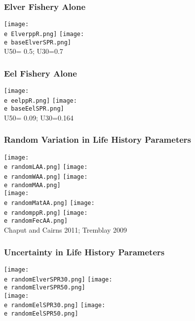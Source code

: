 \documentclass{beamer}
\newcommand{\e}{/backup/bio_data/bio.eels/figures/}
\begin{document}



\begin{frame}
	\frametitle{Elver Fishery Alone}
	\centering
	  \texttt{[image: \\e ElverppR.png]}
	  \texttt{[image: \\e baseElverSPR.png]}\\[-1ex]
	{\tiny{ U50= 0.5; U30=0.7}}


\end{frame}




\begin{frame}
	\frametitle{Eel Fishery Alone}
	\centering
	  \texttt{[image: \\e eelppR.png]}
	  \texttt{[image: \\e baseEelSPR.png]}\\[-1ex]
	{\tiny{ U50= 0.09; U30=0.164}}


\end{frame}



\begin{frame}
	\frametitle{Random Variation in Life History Parameters}
	\centering
	  \texttt{[image: \\e randomLAA.png]}
      \texttt{[image: \\e randomWAA.png]}
 \texttt{[image: \\e randomMAA.png]} \\

 \texttt{[image: \\e randomMatAA.png]}
 \texttt{[image: \\e randomppR.png]}
	\texttt{[image: \\e randomFecAA.png]}\\[-1ex]
	{\tiny Chaput and Cairns 2011; Tremblay 2009}
\end{frame}




\begin{frame}
	\frametitle{Uncertainty in Life History Parameters}
	\centering
	  \texttt{[image: \\e randomElverSPR30.png]}
	  \texttt{[image: \\e randomElverSPR50.png]}\\
	  \texttt{[image: \\e randomEelSPR30.png]}	
	  \texttt{[image: \\e randomEelSPR50.png]}



\end{frame}
\end{document}
